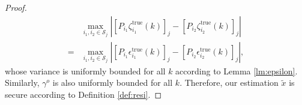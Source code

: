 \documentclass{ieeetrans}   %
\newcommand{\Sc}{{\mathcal{S}}}
\newcommand{\re}{\text{true}}
\newtheorem*{proof}{\textbf{Proof}}
\begin{document}
\begin{proof}
\begin{align*}
&\max_{i_1,i_2\in \Sc_j} \left| \left[P_{i_1} \zeta^\re_{i_1}(k)\right]_j- \left[P_{i_2} \zeta^\re_{i_2}(k)\right]_j \right| \\
=&\max_{i_1,i_2\in \Sc_j} \left| \left[P_{i_1} \epsilon^\re_{i_1}(k)\right]_j- \left[P_{i_2} \epsilon^\re_{i_2}(k)\right]_j \right| ,
\end{align*}
whose variance is uniformly bounded for all $k$ according to Lemma \ref{lm:epsilon}. Similarly, $\gamma^o$ is also uniformly bounded for all $k$. Therefore, our estimation $\tilde{x}$ is secure according to Definition \ref{def:resi}.
\end{proof}


	



%	


\addtolength{\textheight}{-12cm}   %
\end{document}

